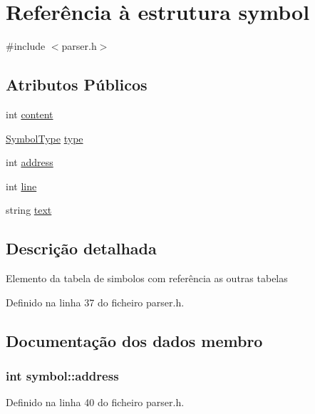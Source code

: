 \hypertarget{structsymbol}{\section{Referência à estrutura symbol}
\label{structsymbol}
}


{\ttfamily \#include $<$parser.\-h$>$}

\subsection*{Atributos Públicos}
\begin{DoxyCompactItemize}
\item 
int \hyperlink{structsymbol_a72c61f7152e8fadf84f1d13136ba741b}{content}
\item 
\hyperlink{parser_8h_add8909e1085c0c32f8380ff493a243b3}{Symbol\-Type} \hyperlink{structsymbol_adba0eaeb4bfbf4787bd3899e4202cc90}{type}
\item 
int \hyperlink{structsymbol_aa61e9dd64d1465422a2b39ca16dc3aca}{address}
\item 
int \hyperlink{structsymbol_a9080179a3d7c5bbfaf9de1817f00c2c7}{line}
\item 
string \hyperlink{structsymbol_ad8fc4d46c20c78f051903a5d06151e86}{text}
\end{DoxyCompactItemize}


\subsection{Descrição detalhada}
Elemento da tabela de simbolos com referência as outras tabelas 

Definido na linha 37 do ficheiro parser.\-h.



\subsection{Documentação dos dados membro}
\hypertarget{structsymbol_aa61e9dd64d1465422a2b39ca16dc3aca}{
\subsubsection[{address}]{\setlength{\rightskip}{0pt plus 5cm}int symbol\-::address}}\label{structsymbol_aa61e9dd64d1465422a2b39ca16dc3aca}


Definido na linha 40 do ficheiro parser.\-h.

